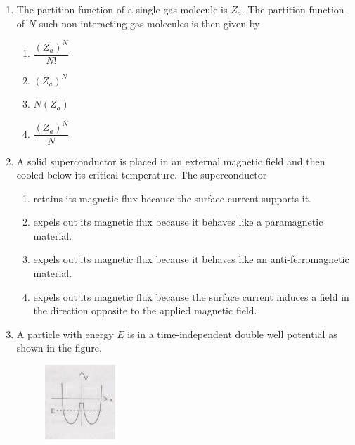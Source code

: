 \documentclass[journal,13pt,onecolumn]{IEEEtran}
\begin{document}
\begin{enumerate}[itemsep = 1em]
\item The partition function of a single gas molecule is $Z_a$. The partition function of $N$ such non-interacting gas molecules is then given by

\hfill{}


\begin{multicols}{2}
\begin{enumerate}
\item $\dfrac{(Z_a)^N}{N!}$
\item $(Z_a)^N$
\item $N(Z_a)$
\item $\dfrac{(Z_a)^N}{N}$
\end{enumerate}
\end{multicols}


\item A solid superconductor is placed in an external magnetic field and then cooled below its critical temperature. The superconductor

\hfill{}


\begin{multicols}{2}
\begin{enumerate}
\item retains its magnetic flux because the surface current supports it.
\item expels out its magnetic flux because it behaves like a paramagnetic material.
\item expels out its magnetic flux because it behaves like an anti-ferromagnetic material.
\item expels out its magnetic flux because the surface current induces a field in the direction opposite to the applied magnetic field.

\end{enumerate}
\end{multicols}


\item A particle with energy $E$ is in a time-independent double well potential as shown in the figure.

\begin{figure}[h!]
    \centering
    \includegraphics[width=0.25\textwidth]{fig1.jpeg}
    \caption{}
    \label{fig:fig1.jpeg}
\end{figure}


\end{enumerate}
\end{document}
